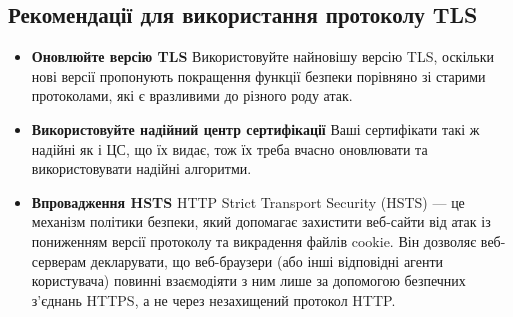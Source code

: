 \subsection{Рекомендації для використання протоколу TLS}
\begin{itemize}
    \item \textbf{Оновлюйте версію TLS}
    Використовуйте найновішу версію TLS, оскільки нові версії пропонують покращення функції безпеки порівняно зі старими протоколами, які є вразливими до різного роду атак.
    
    \item \textbf{Використовуйте надійний центр сертифікації}
    Ваші сертифікати такі ж надійні як і ЦС, що їх видає, тож їх треба вчасно оновлювати та використовувати надійні алгоритми.
    
    \item \textbf{Впровадження HSTS}
    HTTP Strict Transport Security (HSTS) — це механізм політики безпеки, який допомагає захистити веб-сайти від атак із пониженням версії протоколу та викрадення файлів cookie. Він дозволяє веб-серверам декларувати, що веб-браузери (або інші відповідні агенти користувача) повинні взаємодіяти з ним лише за допомогою безпечних з’єднань HTTPS, а не через незахищений протокол HTTP.
    
\end{itemize}